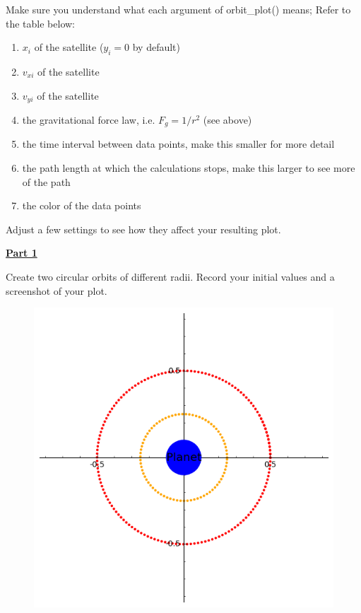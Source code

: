 \documentclass[12pt]{article}
\begin{document}
%
Make sure you understand what each argument of orbit\_plot() means;
Refer to the table below:
\begin{enumerate}
  \item $x_i$ of the satellite ($y_i = 0$ by default)
  \item $v_{xi}$ of the satellite
  \item $v_{yi}$ of the satellite
  \item the gravitational force law, i.e. $F_g = 1/r^2$ (see above)
  \item the time interval between data points, make this smaller for more detail
  \item the path length at which the calculations stops, make this larger to see more of the path
  \item the color of the data points
\end{enumerate}
Adjust a few settings to see how they affect your resulting plot.
\hfill \break

\underline{\textbf{Part 1}} \par
Create two circular orbits of different radii.
Record your initial values and a screenshot of your plot.
%
\begin{figure}[H]
\includegraphics[scale=0.60]{figures/part1.png}
\end{figure}
\end{document}
